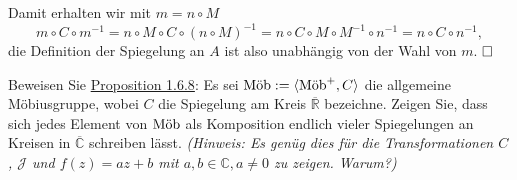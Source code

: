 \documentclass[11pt]{book}
\numberwithin{dummy}{section}
\theoremstyle{nonumberbreak}
\newenvironment{prob}[1][]{\ifthenelse{\equal{#1}{}}{\problem}{\problem[#1]}\rm}{\endproblem}
\newenvironment{sol}[1][]{\ifthenelse{\equal{#1}{}}{\solution}{\solution[#1]}\rm}{\endsolution}
\newcommand{\C}{\mathbb{C}}
\newcommand{\RR}{\overline{\mathbb{R}}}
\newcommand{\CC}{\overline{\mathbb{C}}}
\newcommand{\mob}{\textup{Möb}^+}
\newcommand{\amob}{\textup{Möb}}
\begin{document}
\begin{spacing}{1.4}
\begin{prob}
\begin{sol}
\begin{compactenum}
\end{compactenum}
Damit erhalten wir mit $m=n \circ M$
$$m \circ C \circ m^{-1}= n \circ M \circ C \circ (n \circ M)^{-1} = n \circ C \circ M \circ M^{-1} \circ n^{-1} = n \circ C \circ n^{-1},$$
die Definition der Spiegelung an $A$ ist also unabhängig von der Wahl von $m$. $\hfill \Box$

\end{sol}

\end{prob}






\hypertarget{Adreizwei}{}
\begin{prob}    %
Beweisen Sie \hyperlink{propeinssechsacht}{Proposition 1.6.8}:
Es sei $\amob:= \langle \mob,C\rangle$ die allgemeine Möbiusgruppe, wobei $C$ die Spiegelung am Kreis $\RR$ bezeichne. Zeigen Sie, dass sich jedes Element von $\amob$ als Komposition endlich vieler Spiegelungen an Kreisen in $\CC$ schreiben lässt.
\textit{(Hinweis: Es genüg dies für die Transformationen $C$, $\mathcal{J}$ und $f(z)=az+b$ mit $a,b \in \C, a \neq 0$ zu zeigen. Warum?)}


\end{prob}
\end{spacing}
\end{document}
